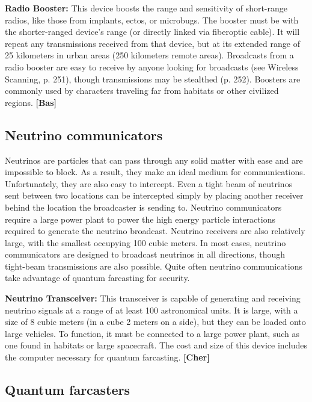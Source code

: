 {{\textbf{Radio Booster:} This device boosts the range and sensitivity of short-range radios, like those from implants, ectos, or microbugs. The booster must be with the shorter-ranged device’s range (or directly linked via fiberoptic cable). It will repeat any transmissions received from that device, but at its extended range of 25 kilometers in urban areas (250 kilometers remote areas). Broadcasts from a radio booster are easy to receive by anyone looking for broadcasts (see Wireless Scanning, p. 251), though transmissions may be stealthed (p. 252). Boosters are commonly used by characters traveling far from habitats or other civilized regions. \textbf{[Bas]} 



\subsection{Neutrino communicators} \label{sec:neutrino-communicators} 

Neutrinos are particles that can pass through any solid matter with ease and are impossible to block. As a result, they make an ideal medium for communications. Unfortunately, they are also easy to intercept. Even a tight beam of neutrinos sent between two locations can be intercepted simply by placing another receiver behind the location the broadcaster is sending to. Neutrino communicators require a large power plant to power the high energy particle interactions required to generate the neutrino broadcast. Neutrino receivers are also relatively large, with the smallest occupying 100 cubic meters. In most cases, neutrino communicators are designed to broadcast neutrinos in all directions, though tight-beam transmissions are also possible. Quite often neutrino communications take advantage of quantum farcasting for security. 

\textbf{Neutrino Transceiver:} This transceiver is capable of generating and receiving neutrino signals at a range of at least 100 astronomical units. It is large, with a size of 8 cubic meters (in a cube 2 meters on a side), but they can be loaded onto large vehicles. To function, it must be connected to a large power plant, such as one found in habitats or large spacecraft. The cost and size of this device includes the computer necessary for quantum farcasting. \textbf{[Cher]} 

\subsection{Quantum farcasters} \label{sec:quantum-farcasters} 

}}
